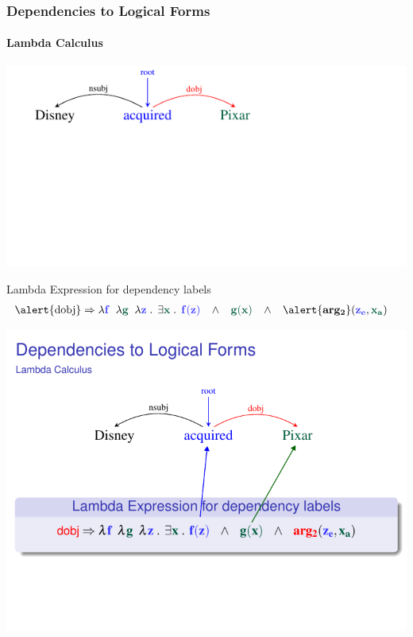 \documentclass[mathserif,12pt]{beamer}
\newcommand{\hlight}[1]{{\color{blue!80} #1}}
\renewcommand{\land}{\wedge}
\newcommand{\lspace}{.\,}
\begin{document}
\begin{frame}
\frametitle{Dependencies to Logical Forms}
\framesubtitle{Lambda Calculus}
\vspace{-2.4em}
\begin{center}
\includegraphics[trim=2em 9.4em 10em 0em,clip=true,scale=1.3]{figures/pixar_dobj}

\end{center}

\vspace{1cm}

\begin{block}{\centering Lambda Expression for dependency labels}
\vspace{-0.5cm}
\begin{align*}
  \hbox{\alert{dobj}} & \Rightarrow  \lambda \hlight{\mathbf{f}}\;\; \lambda {\color{blue!40!green!60!black} \mathbf{g}}\;\; \lambda \hlight{\mathbf{z}}\; \lspace \; \exists {\color{blue!40!green!60!black} \mathbf{x}}\; \lspace \; \hlight{\mathbf{f(z)}}\;\;\; \land \;\;\; {\color{blue!40!green!60!black} \mathbf{g(x)}}  \;\;\; \land\;\;\; \alert{\mathbf{arg_2}}(\hlight{\mathbf{z_e}}, {\color{blue!40!green!60!black} \mathbf{x_a}})
\end{align*}
\vspace{-0.5cm}
\end{block}
\end{frame}

\begin{frame}[noframenumbering]
\includegraphics[trim=1em 0em 0em 0em,clip=false,scale=1]{figures/dobj-lambda-calculus}
\end{frame} 
\end{document}
